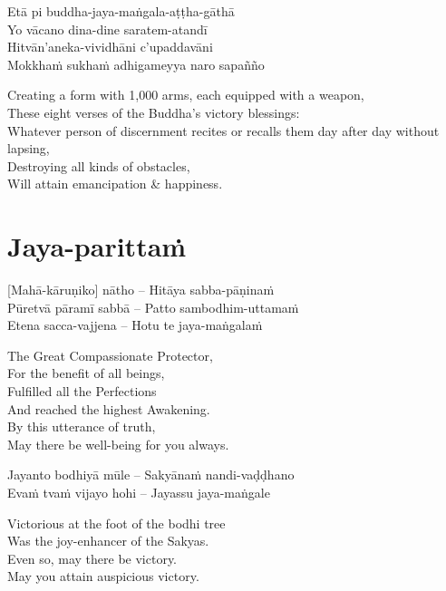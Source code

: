 Etā pi buddha-jaya-maṅgala-aṭṭha-gāthā\\
Yo vācano dina-dine saratem-atandī\\
Hitvān'aneka-vividhāni c'upaddavāni\\
Mokkhaṁ sukhaṁ adhigameyya naro sapañño

\begin{english}
  Creating a form with 1,000 arms, each equipped with a weapon,\\
  These eight verses of the Buddha's victory blessings:\\
  Whatever person of discernment recites or recalls them day after day without lapsing,\\
  Destroying all kinds of obstacles,\\
  Will attain emancipation \& happiness.
\end{english}

\suttaRef{[Trad]}

\section{Jaya-parittaṁ}
\label{jaya-parittam}
[Mahā-kāruṇiko] nātho – Hitāya sabba-pāṇinaṁ\\
Pūretvā pāramī sabbā – Patto sambodhim-uttamaṁ\\
Etena sacca-vajjena – Hotu te jaya-maṅgalaṁ

\begin{english}
  The Great Compassionate Protector,\\
  For the benefit of all beings,\\
  Fulfilled all the Perfections\\
  And reached the highest Awakening.\\
  By this utterance of truth,\\
  May there be well-being for you always.
\end{english}

Jayanto bodhiyā mūle – Sakyānaṁ nandi-vaḍḍhano\\
Evaṁ tvaṁ vijayo hohi – Jayassu jaya-maṅgale

\begin{english}
  Victorious at the foot of the bodhi tree\\
  Was the joy-enhancer of the Sakyas.\\
  Even so, may there be victory.\\
  May you attain auspicious victory.
\end{english}

